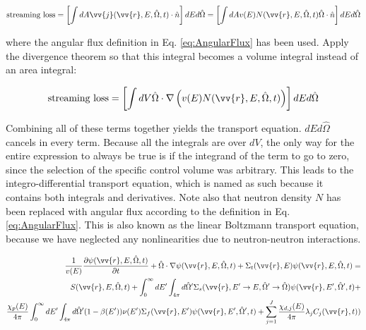 \documentclass[10pt]{article}
\begin{document}
\begin{flushleft}
\begin{equation}
\label{eq:ConservationStreaming1}
\textrm{streaming loss} = \left\lbrack\int dA \vv{j}(\vv{r}, E, \hat{\Omega},t)\cdot \hat{n}\right\rbrack dEd\hat{\Omega}=\left\lbrack\int dA v(E)N(\vv{r}, E, \hat{\Omega},t)\hat{\Omega}\cdot \hat{n}\right\rbrack dEd\hat{\Omega}
\end{equation}

where the angular flux definition in Eq. \eqref{eq:AngularFlux} has been used. Apply the divergence theorem so that this integral becomes a volume integral instead of an area integral:

\begin{equation}
\label{eq:ConservationStreaming2}
\textrm{streaming loss} =\left\lbrack\int dV \hat{\Omega}\cdot\nabla\left(v(E)N(\vv{r}, E, \hat{\Omega},t)\right)\right\rbrack dEd\hat{\Omega}
\end{equation}

Combining all of these terms together yields the transport equation. \(dEd\hat{\Omega}\) cancels in every term. Because all the integrals are over \(dV\), the only way for the entire expression to always be true is if the integrand of the term to go to zero, since the selection of the specific control volume was arbitrary. This leads to the integro-differential transport equation, which is named as such because it contains both integrals and derivatives. Note also that neutron density \(N\) has been replaced with angular flux according to the definition in Eq. \eqref{eq:AngularFlux}. This is also known as the linear Boltzmann transport equation, because we have neglected any nonlinearities due to neutron-neutron interactions. 

\begin{equation}
\label{eq:TE}
\begin{aligned}
\frac{1}{v(E)} \frac{\partial\psi(\vv{r}, E, \hat{\Omega},t)}{\partial t} +
 \hat{\Omega}\cdot\nabla\psi(\vv{r}, E, \hat{\Omega},t) + 
 \Sigma_t(\vv{r},E)\psi(\vv{r}, E, \hat{\Omega},t) = \\
S(\vv{r}, E, \hat{\Omega},t) + \int_{0}^{\infty}dE' \int_{4\pi}^{ } d\hat{\Omega}' \Sigma_s(\vv{r}, E'\rightarrow E, \hat{\Omega}'\rightarrow\hat{\Omega})\psi(\vv{r}, E', \hat{\Omega}',t) + \\
 \frac{\chi_p(E)}{4\pi} \int_{0}^{\infty} dE'\int_{4\pi}^{} d\hat{\Omega}'(1-\beta(E'))\nu(E')\Sigma_f(\vv{r}, E')\psi(\vv{r}, E', \hat{\Omega}',t) + 
 \sum_{j = 1}^{J} \frac{\chi_{d,j}(E)}{4\pi} \lambda_j C_j(\vv{r}, t))
\end{aligned}
\end{equation}


\end{flushleft}
\end{document}
